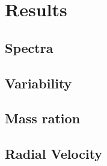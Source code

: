 \chapter{Results}\label{chap:results}
\thispagestyle{fancy}

\section{Spectra}

\section{Variability}

\section{Mass ration}

\section{Radial Velocity}
